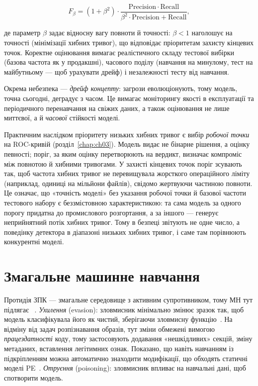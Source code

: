 \begin{equation}
F_\beta = (1+\beta^2)\cdot\frac{\mathrm{Precision}\cdot\mathrm{Recall}}{\beta^2\cdot\mathrm{Precision}+\mathrm{Recall}},
\label{eq:ch09-fbeta}
\end{equation}

де параметр $\beta$ задає відносну вагу повноти й точності: $\beta<1$ наголошує на точності (мінімізації хибних тривог), що відповідає пріоритетам захисту кінцевих точок. Коректне оцінювання вимагає реалістичного складу тестової вибірки (базова частота як у продакшні), часового поділу (навчання на минулому, тест на майбутньому --- щоб урахувати дрейф) і незалежності тесту від навчання.

Окрема небезпека --- \emph{дрейф концепту}: загрози еволюціонують, тому модель, точна сьогодні, деградує з часом. Це вимагає моніторингу якості в експлуатації та періодичного перенавчання на свіжих даних, а також оцінювання не лише миттєвої, а й \emph{часової} стійкості моделі.

Практичним наслідком пріоритету низьких хибних тривог є вибір \emph{робочої точки} на ROC-кривій (розділ~\ref{chap:ch03}). Модель видає не бінарне рішення, а оцінку певності; поріг, за яким оцінку перетворюють на вердикт, визначає компроміс між повнотою й хибними тривогами. У захисті кінцевих точок поріг зсувають так, щоб частота хибних тривог не перевищувала жорсткого операційного ліміту (наприклад, одиниці на мільйони файлів), свідомо жертвуючи частиною повноти. Це означає, що «точність моделі» без указання робочої точки й базової частоти тестового набору є беззмістовною характеристикою: та сама модель за одного порогу придатна до промислового розгортання, а за іншого --- генерує неприйнятний потік хибних тривог. Тому в безпеці звітують не одне число, а поведінку детектора в діапазоні низьких хибних тривог, і саме там порівнюють конкурентні моделі.

\section{Змагальне машинне навчання}\label{sec:ch09-adversarial}

Протидія ЗПК --- змагальне середовище з активним супротивником, тому МН тут підлягає ~\cite{ch09:biggio}. \emph{Ухилення} (evasion): зловмисник мінімально змінює зразок так, щоб модель класифікувала його як чистий, зберігаючи зловмисну функцію~\cite{ch09:grosse}. На відміну від задач розпізнавання образів, тут зміни обмежені вимогою \emph{працездатності} коду, тому застосовують додавання «нешкідливих» секцій, зміну метаданих, вставлення легітимних ознак. Показано, що навіть навчанням із підкріпленням можна автоматично знаходити модифікації, що обходять статичні моделі PE~\cite{ch09:anderson-gym}. \emph{Отруєння} (poisoning): зловмисник впливає на навчальні дані, щоб спотворити модель.

